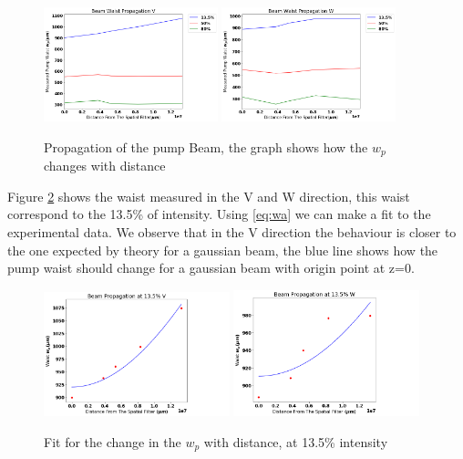 \begin{figure}[h!]
\centering
{  \includegraphics[width=0.45\textwidth]{Figures/propagationV.png} }
{  \includegraphics[width=0.45\textwidth]{Figures/propagationW.png} }
\caption{Propagation of the pump Beam, the graph shows how the $w_p$ changes with distance}
 \label{fig:pro}
\end{figure}

Figure \ref{fig:p} shows the waist measured in the V and W direction, this waist correspond to the 13.5\% of intensity. Using \ref{eq:wa}
we can make a fit to the experimental data. We observe that in the V direction the behaviour is closer 
to the one expected by theory for a gaussian beam, the blue line shows how the pump waist should change for a gaussian beam with origin point
at z=0.


\begin{figure}[h!]
\centering
{  \includegraphics[width=0.48\textwidth]{Figures/proV.png} }
{  \includegraphics[width=0.48\textwidth]{Figures/proW.png} }
\caption{Fit for the change in the $w_p$ with distance, at 13.5\% intensity}
 \label{fig:p}
\end{figure}

